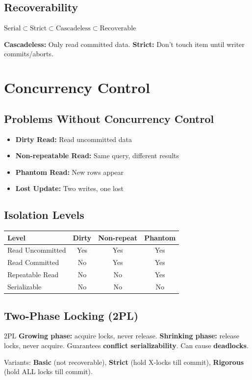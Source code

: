 \documentclass[12pt,a4paper]{article}
\begin{document}
\subsection{Recoverability}
$\text{Serial} \subset \text{Strict} \subset \text{Cascadeless} \subset \text{Recoverable}$

\textbf{Cascadeless:} Only read committed data. \textbf{Strict:} Don't touch item until writer commits/aborts.

\section{Concurrency Control}

\subsection{Problems Without Concurrency Control}
\begin{itemize}[leftmargin=*]
    \item \textbf{Dirty Read:} Read uncommitted data
    \item \textbf{Non-repeatable Read:} Same query, different results
    \item \textbf{Phantom Read:} New rows appear
    \item \textbf{Lost Update:} Two writes, one lost
\end{itemize}

\subsection{Isolation Levels}
\begin{center}
\begin{tabular}{@{}l c c c@{}}
\toprule
\textbf{Level} & \textbf{Dirty} & \textbf{Non-repeat} & \textbf{Phantom} \\
\midrule
Read Uncommitted & Yes & Yes & Yes \\
Read Committed & No & Yes & Yes \\
Repeatable Read & No & No & Yes \\
Serializable & No & No & No \\
\bottomrule
\end{tabular}
\end{center}

\subsection{Two-Phase Locking (2PL)}
\begin{conceptbox}{2PL}
\textbf{Growing phase:} acquire locks, never release. \textbf{Shrinking phase:} release locks, never acquire. Guarantees \textbf{conflict serializability}. Can cause \textbf{deadlocks}.

Variants: \textbf{Basic} (not recoverable), \textbf{Strict} (hold X-locks till commit), \textbf{Rigorous} (hold ALL locks till commit).
\end{conceptbox}
\end{document}
